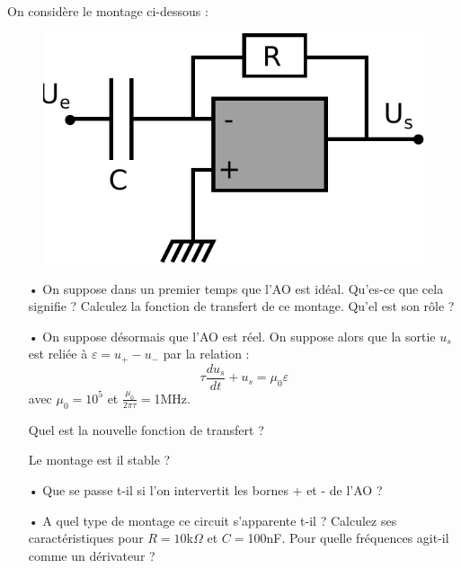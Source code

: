 \documentclass{report}
\begin{document}
On considère le montage ci-dessous :
\begin{figure}[!h]
\centering
\includegraphics[width=0.5\linewidth]{derivateur.pdf}
\end{figure}
\begin{itemize}
	\item[•] On suppose dans un premier temps que l'AO est idéal. Qu'es-ce que cela signifie ? Calculez la fonction de transfert de ce montage. Qu'el est son rôle ?
	\item[•] On suppose désormais que l'AO est réel. On suppose alors que la sortie $u_s$ est reliée à $\varepsilon=u_+-u_-$ par la relation :
	\begin{equation}
		\tau\frac{du_s}{dt} +u_s = \mu_0\varepsilon
	\end{equation}
	avec $\mu_0=10^5$ et $\frac{\mu_0}{2\pi\tau}=$1MHz.
	
	Quel est la nouvelle fonction de transfert ? 
	
	Le montage est il stable ?
	
	\item[•] Que se passe t-il si l'on intervertit les bornes + et - de l'AO ?
	
	\item[•] A quel type de montage ce circuit s'apparente t-il ? Calculez ses caractéristiques pour $R=10$k$\Omega$ et $C=$100nF. Pour quelle fréquences agit-il comme un dérivateur ? 
\end{itemize}
\end{document}
